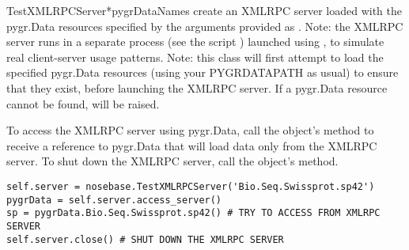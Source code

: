 \documentclass{howto}
\begin{document}
\begin{funcdesc}{TestXMLRPCServer}{*pygrDataNames}
  create an XMLRPC server loaded with the pygr.Data resources specified
  by the arguments provided as .  Note: the XMLRPC server
  runs in a separate process (see the script )
  launched using , to simulate
  real client-server usage patterns.  Note: this class will first attempt to
  load the specified pygr.Data resources (using your PYGRDATAPATH as usual)
  to ensure that they exist, before launching the XMLRPC server.  If a pygr.Data
  resource cannot be found,  will be raised.

  To access the XMLRPC server
  using pygr.Data, call the object's  method to receive a reference
  to pygr.Data that will load data only from the XMLRPC server.  To shut down the
  XMLRPC server, call the object's  method.
\begin{verbatim}
self.server = nosebase.TestXMLRPCServer('Bio.Seq.Swissprot.sp42')
pygrData = self.server.access_server()
sp = pygrData.Bio.Seq.Swissprot.sp42() # TRY TO ACCESS FROM XMLRPC SERVER
self.server.close() # SHUT DOWN THE XMLRPC SERVER
\end{verbatim}
\end{funcdesc}
\end{document}
